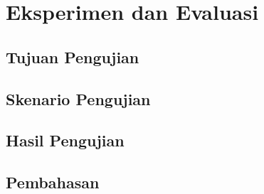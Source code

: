 \chapter{Eksperimen dan Evaluasi}

\section{Tujuan Pengujian}
\blindtext

\section{Skenario Pengujian}
\blindtext

\section{Hasil Pengujian}
\blindtext

\section{Pembahasan}
\blindtext